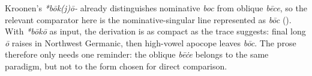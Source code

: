\documentclass[
  british,
  a4paper,
]{article}
\begin{document}
\noindent{} \endgroup

Kroonen's \emph{*bōk(j)ō-} already distinguishes nominative \emph{boc}
from oblique \emph{bēce}, so the relevant comparator here is the
nominative-singular line represented as \emph{bōc}
(). With \emph{*bōkō} as
input, the derivation is as compact as the trace suggests: final long
\emph{ō} raises in Northwest Germanic, then high-vowel apocope leaves
\emph{bōc}. The prose therefore only needs one reminder: the oblique
\emph{bēċe} belongs to the same paradigm, but not to the form chosen for
direct comparison.
\end{document}
